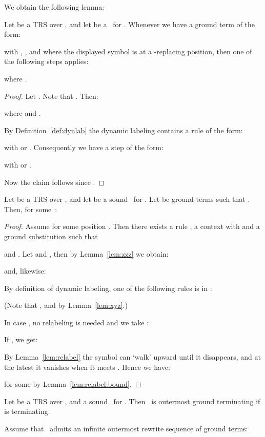 We obtain the following lemma: 
\begin{lemma}\label{lem:relabel}
  Let  be a TRS over , 
  and let  be a \clabeling\ for .
Whenever we have a ground term  of the form:
  
  with , ,
  and where the displayed  symbol is at a -replacing position,
  then one of the following steps applies:
  
  where .
\end{lemma}
\begin{proof}
  Let . 
  Note that .
  Then:

  where 
  and .

  By Definition~\ref{def:dynlab} the dynamic labeling  contains a rule of the form:
  
  with  or .
  Consequently we have a step of the form:
  
  with  or .

  Now the claim follows since .
\end{proof}

\begin{lemma}\label{lem:dynlab:sound}
  Let  be a TRS over , 
  and let  be a sound \clabeling\ for .
  Let  be ground terms
  such that . 
  Then, for some \,:
  
\end{lemma}
\begin{proof}
  Assume  for some position .
  Then there exists a rule , 
  a context  with 
  and a ground substitution  such that 
   
  and .
\newcommand{\labacxt}[1]{\overline{\acontext}_{#1}}\newcommand{\labasubst}{\overline{\asubst}}Let  
  and , then by Lemma~\ref{lem:zzz} we obtain:
  
  \newcommand{\refeqsimplt}{\ensuremath{\ref{eq:simpl:t}}}and, likewise:
  

  By definition of dynamic labeling, one of the following rules is in : 

  (Note that 
  , 
  and  by Lemma~\ref{lem:xyz}.)
  
  In case , 
  no relabeling is needed and we take :
  
  
  If , 
  we get:
   
By Lemma~\ref{lem:relabel} the  symbol can `walk' upward until it disappears,
  and at the latest it vanishes when it meets . 
  Hence we have:
  
  for some  by Lemma~\ref{lem:relabel:bound}.
\end{proof}

\begin{theorem}\label{thm:dynlab:sound}
  Let  be a TRS over , 
  and  a sound \clabeling\ for .
  Then \ is outermost ground terminating if  is terminating.
\end{theorem}
\proof
  Assume that \, admits an infinite outermost rewrite sequence of ground terms:
  
